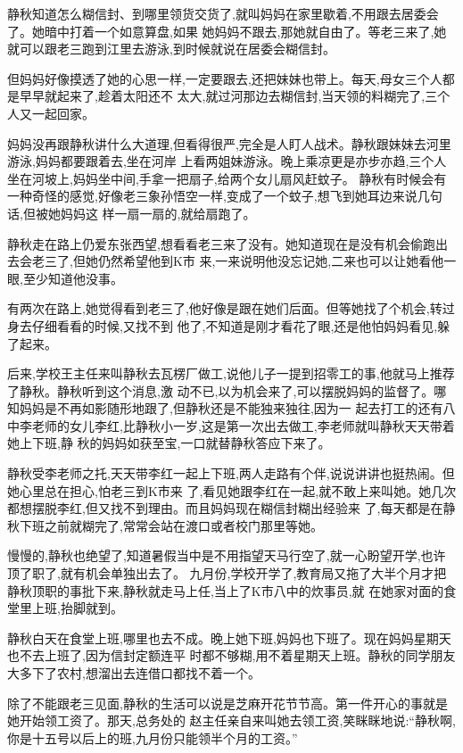 ﻿\documentclass[12pt]{article}
\begin{document}
静秋知道怎么糊信封、到哪里领货交货了,就叫妈妈在家里歇着,不用跟去居委会了。她暗中打着一个如意算盘,如果
她妈妈不跟去,那她就自由了。等老三来了,她就可以跟老三跑到江里去游泳,到时候就说在居委会糊信封。

但妈妈好像摸透了她的心思一样,一定要跟去,还把妹妹也带上。每天,母女三个人都是早早就起来了,趁着太阳还不
太大,就过河那边去糊信封,当天领的料糊完了,三个人又一起回家。

妈妈没再跟静秋讲什么大道理,但看得很严,完全是人盯人战术。静秋跟妹妹去河里游泳,妈妈都要跟着去,坐在河岸
上看两姐妹游泳。晚上乘凉更是亦步亦趋,三个人坐在河坡上,妈妈坐中间,手拿一把扇子,给两个女儿扇风赶蚊子。
静秋有时候会有一种奇怪的感觉,好像老三象孙悟空一样,变成了一个蚊子,想飞到她耳边来说几句话,但被她妈妈这
样一扇一扇的,就给扇跑了。

静秋走在路上仍爱东张西望,想看看老三来了没有。她知道现在是没有机会偷跑出去会老三了,但她仍然希望他到K市
来,一来说明他没忘记她,二来也可以让她看他一眼,至少知道他没事。

有两次在路上,她觉得看到老三了,他好像是跟在她们后面。但等她找了个机会,转过身去仔细看看的时候,又找不到
他了,不知道是刚才看花了眼,还是他怕妈妈看见,躲了起来。

后来,学校王主任来叫静秋去瓦楞厂做工,说他儿子一提到招零工的事,他就马上推荐了静秋。静秋听到这个消息,激
动不已,以为机会来了,可以摆脱妈妈的监督了。哪知妈妈是不再如影随形地跟了,但静秋还是不能独来独往,因为一
起去打工的还有八中李老师的女儿李红,比静秋小一岁,这是第一次出去做工,李老师就叫静秋天天带着她上下班,静
秋的妈妈如获至宝,一口就替静秋答应下来了。

静秋受李老师之托,天天带李红一起上下班,两人走路有个伴,说说讲讲也挺热闹。但她心里总在担心,怕老三到K市来
了,看见她跟李红在一起,就不敢上来叫她。她几次都想摆脱李红,但又找不到理由。而且妈妈现在糊信封糊出经验来
了,每天都是在静秋下班之前就糊完了,常常会站在渡口或者校门那里等她。


慢慢的,静秋也绝望了,知道暑假当中是不用指望天马行空了,就一心盼望开学,也许顶了职了,就有机会单独出去了。
九月份,学校开学了,教育局又拖了大半个月才把静秋顶职的事批下来,静秋就走马上任,当上了K市八中的炊事员,就
在她家对面的食堂里上班,抬脚就到。

静秋白天在食堂上班,哪里也去不成。晚上她下班,妈妈也下班了。现在妈妈星期天也不去上班了,因为信封定额连平
时都不够糊,用不着星期天上班。静秋的同学朋友大多下了农村,想溜出去连借口都找不着一个。

除了不能跟老三见面,静秋的生活可以说是芝麻开花节节高。第一件开心的事就是她开始领工资了。那天,总务处的
赵主任亲自来叫她去领工资,笑眯眯地说:``静秋啊,你是十五号以后上的班,九月份只能领半个月的工资。''
\end{document}
